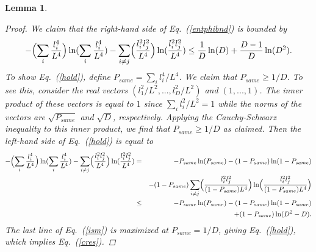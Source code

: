 \documentclass[aps,prl,amsmath,amssymb,amsfonts,superscriptaddress,floatfix]{revtex4}
\newtheorem{lemma}{Lemma}
\newcommand{\be}{\begin{equation}}
\newcommand{\ee}{\end{equation}}
\newcommand{\Pc}{P_{same}}
\begin{document}
\begin{lemma}
\begin{proof}
We claim that the right-hand side of Eq.~(\ref{entphibnd}) is bounded by
\be
\label{hold}
-\Bigl(\sum_i \frac{l_i^4}{L^4}\Bigr) \ln(
\sum_i \frac{l_i^4}{L^4})
-\sum_{i\neq j}
\Bigl(\frac{l_i^2 l_j^2}{L^4}\Bigr)
\ln(\frac{l_i^2 l_j^2}{L^4})
\leq
\frac{1}{D} \ln(D)+\frac{D-1}{D} \ln(D^2).
\ee
To show Eq.~(\ref{hold}), 
define 
$\Pc=\sum_i l_i^4/L^4$.  We claim that
$\Pc\geq 1/D$.  To see this, consider
the real vectors $(l_1^2/L^2,...,l_D^2/L^2)$ and
$(1,...,1)$.  The inner product of these vectors is
equal to $1$ since $\sum_i l_i^2/L^2=1$ while the norms
of the vectors are $\sqrt{\Pc}$ and $\sqrt{D}$, respectively.  Applying the
Cauchy-Schwarz inequality to this inner product, we find
that $\Pc\geq 1/D$ as claimed.
Then the left-hand side of Eq.~(\ref{hold}) is equal to
\begin{eqnarray}
\label{ism}
-\Bigl(\sum_i \frac{l_i^4}{L^4}\Bigr) \ln(
\sum_i \frac{l_i^4}{L^4})
-\sum_{i\neq j}
\Bigl(\frac{l_i^2 l_j^2}{L^4}\Bigr)
\ln(\frac{l_i^2 l_j^2}{L^4})
&=&
-\Pc\ln(\Pc)-(1-\Pc)\ln(1-\Pc)
\\ \nonumber && -(1-\Pc)\sum_{i\neq j}
\Bigl(\frac{l_i^2 l_j^2}{(1-\Pc)L^4}\Bigr)\ln
\Bigl(\frac{l_i^2 l_j^2}{(1-\Pc)L^4}\Bigr)
\\ \nonumber
&\leq &
-\Pc\ln(\Pc)-(1-\Pc)\ln(1-\Pc)
\\ \nonumber && +(1-\Pc)\ln(D^2-D).
\end{eqnarray}
The last line of
Eq.~(\ref{ism}) is maximized at $\Pc=1/D$, giving Eq.~(\ref{hold}),
which implies Eq.~(\ref{cres}).
\end{proof}
\end{lemma}
\end{document}
